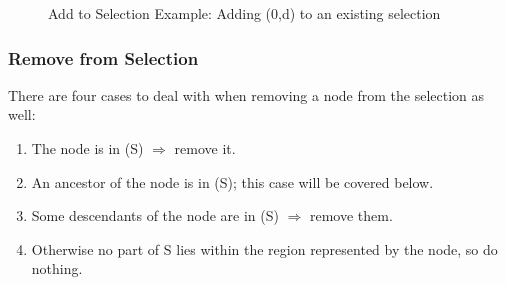 \begin{figure}[p]
\begin{center}
	\hspace{4mm}%
	\hspace{4mm}%
\end{center}
\caption{Add to Selection Example: Adding (0,d) to an existing selection}
\label{fig:ipfs-mnr-addnode}
\end{figure}

\subsubsection{Remove from Selection}

There are four cases to deal with when removing a node from the selection as well:

\begin{enumerate}

\item The node is in (S) $\Rightarrow$ remove it.
\item An ancestor of the node is in (S); this case will be covered below.
\item Some descendants of the node are in (S) $\Rightarrow$ remove them.
\item Otherwise no part of S lies within the region represented by the node, so do nothing.

\end{enumerate}

